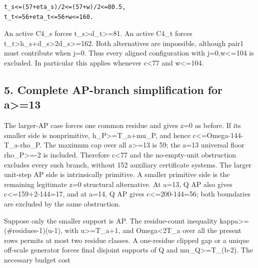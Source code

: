 \documentclass[10pt,a4paper]{article}
\theoremstyle{definition}
\begin{document}
\begin{lstlisting}
t_s<=(57+eta_s)/2<=(57+w)/2<=80.5,
t_t<=56+eta_t<=56+w<=160.
\end{lstlisting}

An active C4\_\allowbreak{}s forces t\_\allowbreak{}s\textgreater d\_\allowbreak{}t\textgreater=\allowbreak{}81. An active
C4\_\allowbreak{}t forces
t\_\allowbreak{}t\textgreater h\_\allowbreak{}s+\allowbreak{}d\_\allowbreak{}s\textgreater2d\_\allowbreak{}s\textgreater=\allowbreak{}162. Both
alternatives are impossible,\allowbreak{} although pair1 must contribute when j=\allowbreak{}0.
Thus every aligned configuration with j=\allowbreak{}0,\allowbreak{}w\textless=\allowbreak{}104 is excluded. In
particular this applies whenever c\textless77 and w\textless=\allowbreak{}104.

\hypertarget{complete-ap-branch-simplification-for-a13}{%
\subsection{5. Complete AP-branch simplification for
a\textgreater=\allowbreak{}13}\label{complete-ap-branch-simplification-for-a13}}

The larger-AP case forces one common residue and gives z=\allowbreak{}0 as before. If
its smaller side is nonprimitive,\allowbreak{} h\_\allowbreak{}P\textgreater=\allowbreak{}T\_\allowbreak{}a+\allowbreak{}mu\_\allowbreak{}P,\allowbreak{} and hence
c\textless=\allowbreak{}Omega-144-T\_\allowbreak{}a-rho\_\allowbreak{}P. The maximum cap over all
a\textgreater=\allowbreak{}13 is 59; the a=\allowbreak{}13 universal floor rho\_\allowbreak{}P\textgreater=\allowbreak{}-2
is included. Therefore c\textless77 and the no-empty-unit obstruction
excludes every such branch,\allowbreak{} without 152 auxiliary certificate systems.
The larger unit-step AP side is intrinsically primitive. A smaller
primitive side is the remaining legitimate z=\allowbreak{}0 structural alternative.
At a=\allowbreak{}13,\allowbreak{} Q AP also gives c\textless=\allowbreak{}159+\allowbreak{}2-144=\allowbreak{}17,\allowbreak{} and at a=\allowbreak{}14,\allowbreak{} Q AP
gives c\textless=\allowbreak{}200-144=\allowbreak{}56; both boundaries are excluded by the same
obstruction.

Suppose only the smaller support is AP. The residue-count inequality
kappa\textgreater=\allowbreak{} (\#residues-1)(u-1),\allowbreak{} with u\textgreater=\allowbreak{}T\_\allowbreak{}a+\allowbreak{}1,\allowbreak{} and
Omega\textless2T\_\allowbreak{}a over all the present rows permits at most two
residue classes. A one-residue clipped gap or a unique off-scale
generator forces final disjoint supports of Q and
mu\_\allowbreak{}Q\textgreater=\allowbreak{}T\_\allowbreak{}(b-2). The necessary budget cost
\end{document}
